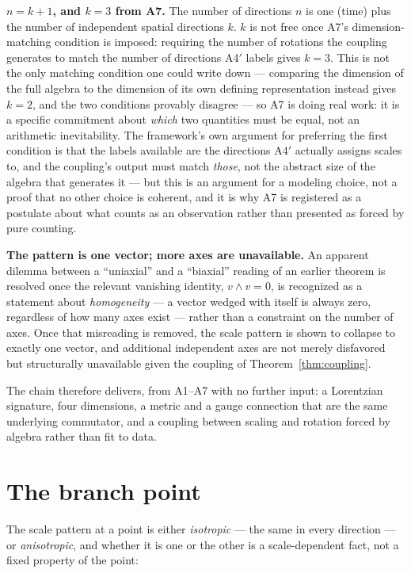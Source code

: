 \documentclass[pdflatex,sn-mathphys-num]{sn-jnl}
\theoremstyle{thmstyleone}
\theoremstyle{thmstylethree}
\theoremstyle{thmstyletwo}
\begin{document}
\textbf{$n=k+1$, and $k=3$ from A7.} The number of directions $n$ is one
(time) plus the number of independent spatial directions $k$. $k$ is not
free once A7's dimension-matching condition is imposed: requiring the
number of rotations the coupling generates to match the number of
directions A4$'$ labels gives $k=3$. This is not the only matching
condition one could write down — comparing the dimension of the full
algebra to the dimension of its own defining representation instead
gives $k=2$, and the two conditions provably disagree — so A7 is doing
real work: it is a specific commitment about \emph{which} two quantities
must be equal, not an arithmetic inevitability. The framework's own
argument for preferring the first condition is that the labels available
are the directions A4$'$ actually assigns scales to, and the coupling's
output must match \emph{those}, not the abstract size of the algebra
that generates it — but this is an argument for a modeling choice, not a
proof that no other choice is coherent, and it is why A7 is registered
as a postulate about what counts as an observation rather than presented
as forced by pure counting.

\textbf{The pattern is one vector; more axes are unavailable.} An
apparent dilemma between a ``uniaxial'' and a ``biaxial'' reading of an
earlier theorem is resolved once the relevant vanishing identity,
$v \wedge v = 0$, is recognized as a statement about \emph{homogeneity} —
a vector wedged with itself is always zero, regardless of how many axes
exist — rather than a constraint on the number of axes. Once that
misreading is removed, the scale pattern is shown to collapse to exactly
one vector, and additional independent axes are not merely disfavored
but structurally unavailable given the coupling of Theorem~\ref{thm:coupling}.

The chain therefore delivers, from A1–A7 with no further input: a
Lorentzian signature, four dimensions, a metric and a gauge connection
that are the same underlying commutator, and a coupling between scaling
and rotation forced by algebra rather than fit to data.

\section{The branch point}\label{sec:branch}

The scale pattern at a point is either \emph{isotropic} — the same in
every direction — or \emph{anisotropic}, and whether it is one or the
other is a scale-dependent fact, not a fixed property of the point:
\end{document}
